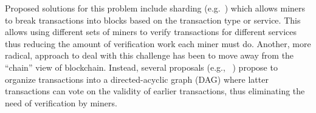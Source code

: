Proposed solutions for this problem include sharding (e.g.~\cite{CCS:LNZBGS16, FC:GenRenSir17}) which allows miners to break transactions into blocks based on the transaction type or service.  This allows using different sets of miners to verify transactions for different services thus reducing the amount of verification work each miner must do.  Another, more radical, approach to deal with this challenge has been to move away from the ``chain'' view of blockchain.  Instead, several proposals (e.g., ~\cite{ePrint:SomLewZoh16,eprint:SomZoh18,IOTA}) propose to organize transactions into a directed-acyclic graph (DAG) where latter transactions can vote on the validity of earlier transactions, thus eliminating the need of verification by miners.
%
%


